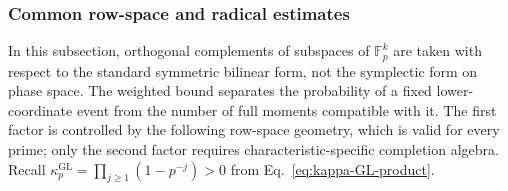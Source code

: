 \documentclass[11pt]{article}
\newcommand{\F}{\mathbb F}
\newcommand{\1}{\mathbf 1}
\theoremstyle{plain}
\theoremstyle{definition}
\theoremstyle{remark}
\begin{document}
\subsubsection{Common row-space and radical estimates}
\label{subsec:common-row-space-estimate}

In this subsection, orthogonal complements of subspaces of $\F_p^k$ are
taken with respect to the standard symmetric bilinear form, not the symplectic
form on phase space.  The weighted bound separates the probability of a fixed
lower-coordinate event from the number of full moments compatible with it.  The first factor is
controlled by the following row-space geometry, which is valid for every
prime; only the second factor requires characteristic-specific completion
algebra.  Recall
$\kappa_p^{\mathrm{GL}}=\prod_{j\ge1}(1-p^{-j})>0$ from
Eq.~\eqref{eq:kappa-GL-product}.
\end{document}
